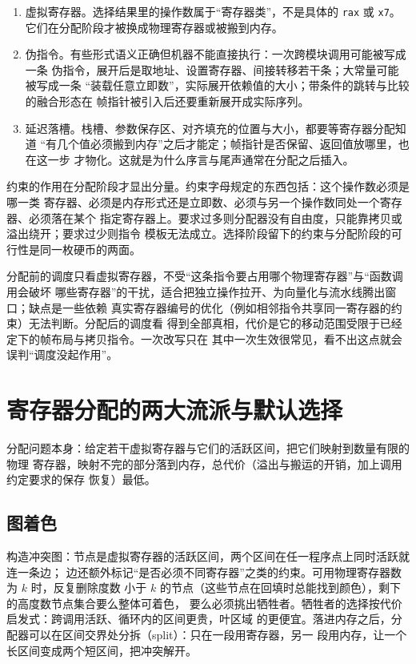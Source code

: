 \documentclass[12pt,a4paper,fontset=fandol]{ctexbook}
\newcommand{\Sym}[1]{\texttt{#1}}
\begin{document}
\begin{enumerate}
  \item 虚拟寄存器。选择结果里的操作数属于“寄存器类”，不是具体的 \Sym{rax} 或
        \Sym{x7}。它们在分配阶段才被换成物理寄存器或被搬到内存。
  \item 伪指令。有些形式语义正确但机器不能直接执行：一次跨模块调用可能被写成一条
        伪指令，展开后是取地址、设置寄存器、间接转移若干条；大常量可能被写成一条
        “装载任意立即数”，实际展开依赖值的大小；带条件的跳转与比较的融合形态在
        帧指针被引入后还要重新展开成实际序列。
  \item 延迟落槽。栈槽、参数保存区、对齐填充的位置与大小，都要等寄存器分配知道
        “有几个值必须搬到内存”之后才能定；帧指针是否保留、返回值放哪里，也在这一步
        才物化。这就是为什么序言与尾声通常在分配之后插入。
\end{enumerate}

约束的作用在分配阶段才显出分量。约束字母规定的东西包括：这个操作数必须是哪一类
寄存器、必须是内存形式还是立即数、必须与另一个操作数同处一个寄存器、必须落在某个
指定寄存器上。要求过多则分配器没有自由度，只能靠拷贝或溢出绕开；要求过少则指令
模板无法成立。选择阶段留下的约束与分配阶段的可行性是同一枚硬币的两面。

\begin{guideline}[title={调度的两次，各有各的理由}]
分配前的调度只看虚拟寄存器，不受“这条指令要占用哪个物理寄存器”与“函数调用会破坏
哪些寄存器”的干扰，适合把独立操作拉开、为向量化与流水线腾出窗口；缺点是一些依赖
真实寄存器编号的优化（例如相邻指令共享同一寄存器的约束）无法判断。分配后的调度看
得到全部真相，代价是它的移动范围受限于已经定下的帧布局与拷贝指令。一次改写只在
其中一次生效很常见，看不出这点就会误判“调度没起作用”。
\end{guideline}

\section{寄存器分配的两大流派与默认选择}\label{sec:cl06-regalloc}

分配问题本身：给定若干虚拟寄存器与它们的活跃区间，把它们映射到数量有限的物理
寄存器，映射不完的部分落到内存，总代价（溢出与搬运的开销，加上调用约定要求的保存
恢复）最低。

\subsection{图着色}\label{sec:cl06-coloring}

构造冲突图：节点是虚拟寄存器的活跃区间，两个区间在任一程序点上同时活跃就连一条边；
边还额外标记“是否必须不同寄存器”之类的约束。可用物理寄存器数为 $k$ 时，反复删除度数
小于 $k$ 的节点（这些节点在回填时总能找到颜色），剩下的高度数节点集合要么整体可着色，
要么必须挑出牺牲者。牺牲者的选择按代价启发式：跨调用活跃、循环内的区间更贵，叶区域
的更便宜。落进内存之后，分配器可以在区间交界处分拆（split）：只在一段用寄存器，另一
段用内存，让一个长区间变成两个短区间，把冲突解开。
\end{document}
